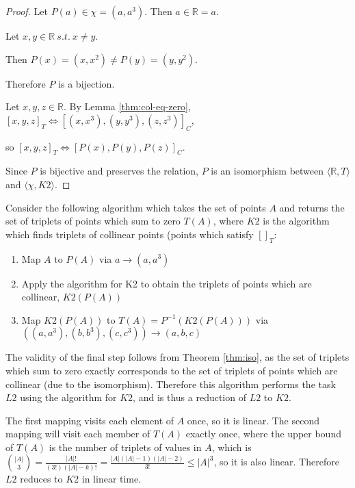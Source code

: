 \documentclass[11pt]{article}
\begin{document}
\begin{proof}
    Let $P(a) \in \chi = (a, a^3)$. Then $a \in \mathbb{R} = a$. 

    Let $x, y \in \mathbb{R} \  s.t. \  x \neq y$. 

    Then $P(x) = (x, x^2) \neq P(y) = (y, y^2)$. 

    Therefore $P$ is a bijection.

    Let $x, y, z \in \mathbb{R}$. By Lemma \ref{thm:col-eq-zero}, $[x, y, z]_T \iff [(x, x^3), (y, y^3), (z, z^3)]_C$, 
    
    so $[x, y, z]_T \iff [P(x), P(y), P(z)]_C$.

    Since $P$ is bijective and preserves the relation, $P$ is an isomorphism between $\langle \mathbb{R}, T \rangle$ and $\langle \chi, K2 \rangle$.
\end{proof}


Consider the following algorithm which takes the set of points $A$ and returns the set of triplets of points which sum to zero $T(A)$, where $K2$ is the algorithm which finds triplets of collinear points (points which satisfy $[]_T$:
\begin{enumerate}
    \item Map $A$ to $P(A)$ via $a \to (a, a^3)$
    \item Apply the algorithm for K2 to obtain the triplets of points which are collinear, $K2(P(A))$
    \item Map $K2(P(A))$ to $T(A) = P^{-1}(K2(P(A)))$ via $((a, a^3), (b, b^3), (c, c^3)) \to (a, b, c)$
\end{enumerate}

The validity of the final step follows from Theorem \ref{thm:iso}, as the set of triplets which sum to zero exactly corresponds to the set of triplets of points which are collinear (due to the isomorphism). Therefore this algorithm performs the task $L2$ using the algorithm for $K2$, and is thus a reduction of $L2$ to $K2$.

The first mapping visits each element of $A$ once, so it is linear. The second mapping will visit each member of $T(A)$ exactly once, where the upper bound of $T(A)$ is the number of triplets of values in $A$, which is $\binom{|A|}{3} = \frac{|A|!}{(3!)(|A| - k)!} = \frac{|A|(|A| - 1)(|A| - 2)}{3!} \leq |A|^3$, so it is also linear. Therefore $L2$ reduces to $K2$ in linear time.
\end{document}
